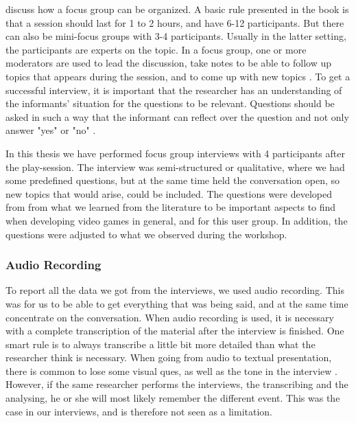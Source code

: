\cite{tjora} discuss how a focus group can be organized.  A basic rule presented in the book is that a session should last for 1 to 2 hours, and have 6-12 participants. But there can also be mini-focus groups with 3-4 participants. Usually in the latter setting, the participants are experts on the topic. In a focus group, one or more moderators are used to lead the discussion, take notes to be able to follow up topics that appears during the session, and to come up with new topics \cite{tjora}. To get a successful interview, it is important that the researcher has an understanding of the informants’ situation for the questions to be relevant. Questions should be asked in such a way that the informant can reflect over the question and not only answer "yes" or "no" \cite{qualitative}.

In this thesis we have performed focus group interviews with 4 participants after the play-session. The interview was semi-structured or qualitative, where we had some predefined questions, but at the same time held the conversation open, so new topics that would arise, could be included. The questions were developed from from what we learned from the literature to be important aspects to find when developing video games in general, and for this user group. In addition, the questions were adjusted to what we observed during the workshop. 

\subsubsection{Audio Recording}
To report all the data we got from the interviews, we used audio recording. This was for us to be able to get everything that was being said, and at the same time concentrate on the conversation. When audio recording is used, it is necessary with a complete transcription of the material after the interview is finished. One smart rule is to always transcribe a little bit more detailed than what the researcher think is necessary. When going from audio to textual presentation, there is common to lose some visual ques, as well as the tone in the interview \cite{tjora}. However, if the same researcher performs the interviews, the transcribing and the analysing, he or she will most likely remember the different event. This was the case in our interviews, and is therefore not seen as a limitation. 

